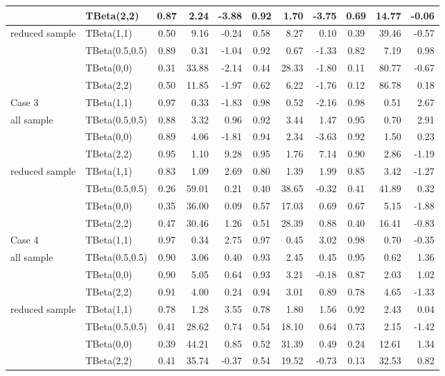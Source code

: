 \documentclass{amsart}
\begin{document}
\begin{table}[ht]
{\begin{tabular}{ll|crr|crr|crr}
			& TBeta(2,2) & 0.87 & 2.24 & -3.88 & 0.92 & 1.70 & -3.75 & 0.69 & 14.77 & -0.06 \\ 
			\midrule
			reduced sample & TBeta(1,1) & 0.50 & 9.16 & -0.24 & 0.58 & 8.27 & 0.10 & 0.39 & 39.46 & -0.57 \\ 
			& TBeta(0.5,0.5) & 0.89 & 0.31 & -1.04 & 0.92 & 0.67 & -1.33 & 0.82 & 7.19 & 0.98 \\ 
			& TBeta(0,0) & 0.31 & 33.88 & -2.14 & 0.44 & 28.33 & -1.80 & 0.11 & 80.77 & -0.67 \\ 
			& TBeta(2,2) & 0.50 & 11.85 & -1.97 & 0.62 & 6.22 & -1.76 & 0.12 & 86.78 & 0.18 \\ 
			\midrule
			Case 3 & TBeta(1,1) & 0.97 & 0.33 & -1.83 & 0.98 & 0.52 & -2.16 & 0.98 & 0.51 & 2.67 \\ 
			all sample & TBeta(0.5,0.5) & 0.88 & 3.32 & 0.96 & 0.92 & 3.44 & 1.47 & 0.95 & 0.70 & 2.91 \\ 
			& TBeta(0,0) & 0.89 & 4.06 & -1.81 & 0.94 & 2.34 & -3.63 & 0.92 & 1.50 & 0.23 \\ 
			& TBeta(2,2) & 0.95 & 1.10 & 9.28 & 0.95 & 1.76 & 7.14 & 0.90 & 2.86 & -1.19 \\ 
			\midrule
			reduced sample & TBeta(1,1) & 0.83 & 1.09 & 2.69 & 0.80 & 1.39 & 1.99 & 0.85 & 3.42 & -1.27 \\ 
			& TBeta(0.5,0.5) & 0.26 & 59.01 & 0.21 & 0.40 & 38.65 & -0.32 & 0.41 & 41.89 & 0.32 \\ 
			& TBeta(0,0) & 0.35 & 36.00 & 0.09 & 0.57 & 17.03 & 0.69 & 0.67 & 5.15 & -1.88 \\ 
			& TBeta(2,2) & 0.47 & 30.46 & 1.26 & 0.51 & 28.39 & 0.88 & 0.40 & 16.41 & -0.83 \\  
			\midrule
			Case 4 & TBeta(1,1) & 0.97 & 0.34 & 2.75 & 0.97 & 0.45 & 3.02 & 0.98 & 0.70 & -0.35 \\ 
			all sample & TBeta(0.5,0.5) & 0.90 & 3.06 & 0.40 & 0.93 & 2.45 & 0.45 & 0.95 & 0.62 & 1.36 \\ 
			& TBeta(0,0) & 0.90 & 5.05 & 0.64 & 0.93 & 3.21 & -0.18 & 0.87 & 2.03 & 1.02 \\ 
			& TBeta(2,2) & 0.91 & 4.00 & 0.24 & 0.94 & 3.01 & 0.89 & 0.78 & 4.65 & -1.33 \\ 
			\midrule
			reduced sample & TBeta(1,1) & 0.78 & 1.28 & 3.55 & 0.78 & 1.80 & 1.56 & 0.92 & 2.43 & 0.04 \\ 
			& TBeta(0.5,0.5) & 0.41 & 28.62 & 0.74 & 0.54 & 18.10 & 0.64 & 0.73 & 2.15 & -1.42 \\ 
			& TBeta(0,0) & 0.39 & 44.21 & 0.85 & 0.52 & 31.39 & 0.49 & 0.24 & 12.61 & 1.34 \\ 
			& TBeta(2,2) & 0.41 & 35.74 & -0.37 & 0.54 & 19.52 & -0.73 & 0.13 & 32.53 & 0.82 \\ 
			\midrule
	\end{tabular}}
\end{table}
\end{document}
